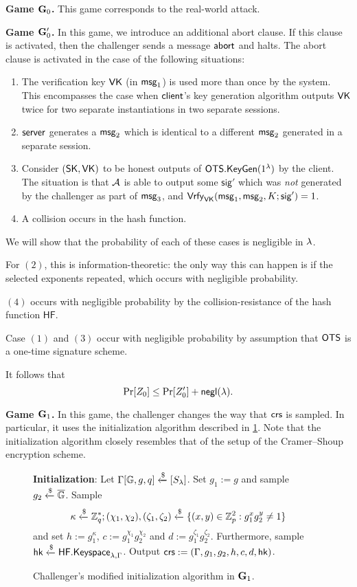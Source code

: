 \medskip
\textbf{Game $\mathbf{G}_0$.} This game corresponds to the real-world attack.

\medskip
\textbf{Game $\mathbf{G}_0'$.} In this game, we introduce an additional abort clause. If this clause is activated, then the challenger sends a message $\mathsf{abort}$ and halts. The abort clause is activated in the case of the following situations:
\begin{enumerate}
	\item The verification key $\mathsf{VK}$ (in $\mathsf{msg}_{1}$) is used more than once by the system. This encompasses the case when $\mathsf{client}$'s key generation algorithm outputs $\mathsf{VK}$ twice for two separate instantiations in two separate sessions.
	\item $\mathsf{server}$ generates a $\mathsf{msg}_{2}$ which is identical to a different $\mathsf{msg}_{2}$ generated in a separate session.
	\item Consider $(\mathsf{SK},\mathsf{VK})$ to be honest outputs of $\mathsf{OTS}.\mathsf{KeyGen}(1^\lambda)$ by the client. The situation is that $\mathcal{A}$ is able to output some $\mathsf{sig}'$ which was \textit{not} generated by the challenger as part of $\mathsf{msg}_{3}$, and $\mathsf{Vrfy}_{\mathsf{VK}}(\mathsf{msg}_{1},\mathsf{msg}_{2},K;\mathsf{sig}')=1$. 
	\item A collision occurs in the hash function.
\end{enumerate}

We will show that the probability of each of these cases is negligible in $\lambda$. 

For $(2)$, this is information-theoretic: the only way this can happen is if the selected exponents repeated, which occurs with negligible probability. 

$(4)$ occurs with negligible probability by the collision-resistance of the hash function $\mathsf{HF}$.

Case $(1)$ and $(3)$ occur with negligible probability by assumption that $\mathsf{OTS}$ is a one-time signature scheme.


It follows that $$\Pr[Z_0] \leq \Pr[Z_0']+\mathsf{negl}(\lambda).$$

\textbf{Game $\mathbf{G}_1$.} In this game, the challenger changes the way that $\mathsf{crs}$ is sampled. In particular, it uses the initialization algorithm described in \cref{fig:initialization-game-1}. Note that the initialization algorithm closely resembles that of the setup of the Cramer--Shoup encryption scheme.

\begin{figure}[h]
	\begin{framed}\small
		\textbf{Initialization}: Let $\Gamma[\mathbb{G},g,q]\xleftarrow{\$}[S_\lambda]$. Set $g_1:= g$ and sample $g_2\xleftarrow{\$}\overline{\mathbb{G}}$. Sample $$\kappa\xleftarrow{\$}\mathbb{Z}_q^{*}; (\chi_1,\chi_2),(\zeta_1,\zeta_2)\xleftarrow{\$}\{(x,y)\in\mathbb{Z}_p^2:g_1^xg_2^y\neq 1\}$$ and set $h:=g_1^\kappa$, $c:=g_1^{\chi_1}g_2^{\chi_2}$ and $d:=g_1^{\zeta_1}g_2^{\zeta_2}$. Furthermore, sample $\mathsf{hk}\xleftarrow{\$}\mathsf{HF.Keyspace}_{\lambda,\Gamma}$. Output $\mathsf{crs} := (\Gamma,g_1, g_2,h,c,d,\mathsf{hk})$.
	\end{framed}
	\caption{Challenger's modified initialization algorithm in $\mathbf{G}_1$.}
	\label{fig:initialization-game-1}
\end{figure}

